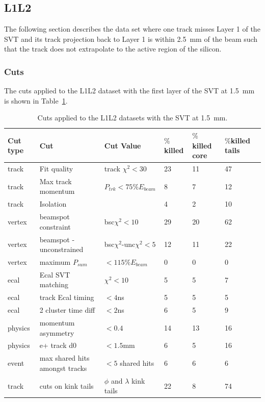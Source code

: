\subsection{L1L2}

The following section describes the data set where one track misses Layer 1 of the SVT and its track projection back to Layer 1 is within 2.5~mm of the beam such that the track does not extrapolate to the active region of the silicon.

\subsubsection{Cuts}

The cuts applied to the L1L2 dataset with the first layer of the SVT at 1.5~mm is shown in Table~\ref{l1l2_cuts_1p5}.

\begin{table}[H]
\caption{Cuts applied to the L1L2 datasets with the SVT at 1.5~mm.}
\label{l1l2_cuts_1p5}
\centering
\begin{tabular}{lllllll}
\toprule
Cut type & Cut & Cut Value &  $\%$killed &  $\%$killed core & $\%$killed tails\\
\midrule
track & Fit quality & track $\chi^{2}<30$ & 23 & 11 & 47 \\
track & Max track momentum &  $P_{trk}<75\%E_{beam}$ & 8 & 7 & 12 \\
track & Isolation &   & 4 & 2 & 10 \\
vertex & beamspot constraint & bsc$\chi^{2}<10$  & 29 & 20 & 62 \\
vertex & beamspot - unconstrained & bsc$\chi^{2}$-unc$\chi^2<5$  & 12 & 11 & 22 \\
vertex & maximum $P_{sum}$ &  $<115\%E_{beam}$ & 0 & 0 & 0 \\
ecal & Ecal SVT matching & $\chi^2<10$  & 5 & 5 & 7 \\
ecal & track Ecal timing & $<4$ns  & 5 & 5 & 5 \\
ecal & 2 cluster time diff & $<2$ns  & 6 & 5 & 9 \\
physics & momentum asymmetry & $<0.4$  & 14 & 13 & 16 \\
physics & e+ track d0 & $<1.5$mm  & 6 & 5 & 16 \\
event & max shared hits amongst tracks & $<5$ shared hits  & 6 & 6 & 6 \\
track & cuts on kink tails & $\phi$ and $\lambda$ kink tails & 22 & 8 & 74 \\
\bottomrule
\end{tabular}
\end{table}

